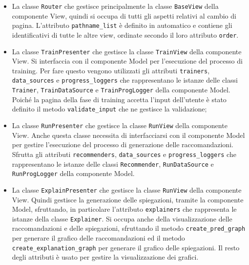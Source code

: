 \begin{itemize}
\item La classe \texttt{Router} che gestisce principalmente la classe \texttt{BaseView} della componente View, quindi si occupa di tutti gli aspetti relativi al cambio di pagina. L'attributo \texttt{pathname\_list} è definito in automatico e contiene gli identificativi di tutte le altre view, ordinate secondo il loro attributo \texttt{order}.

\item La classe \texttt{TrainPresenter} che gestisce la classe \texttt{TrainView} della componente View. Si interfaccia con il componente Model per l'esecuzione del processo di training. Per fare questo vengono utilizzati gli attributi \texttt{trainers}, \texttt{data\_sources} e \texttt{progress\_loggers} che rappresentano le istanze delle classi \texttt{Trainer}, \texttt{TrainDataSource} e \texttt{TrainProgLogger} della componente Model. Poiché la pagina della fase di training accetta l'input dell'utente è stato definito il metodo \texttt{validate\_input} che ne gestisce la validazione;

\item La classe \texttt{RunPresenter} che gestisce la classe \texttt{RunView} della componente View. Anche questa classe necessita di interfacciarsi con il componente Model per gestire l'esecuzione del processo di generazione delle raccomandazioni. Sfrutta gli attributi \texttt{recommenders}, \texttt{data\_sources} e \texttt{progress\_loggers} che rappresentano le istanze delle classi \texttt{Recommender}, \texttt{RunDataSource} e \texttt{RunProgLogger} della componente Model.

\item La classe \texttt{ExplainPresenter} che gestisce la classe \texttt{RunView} della componente View. Quindi gestisce la generazione delle spiegazioni, tramite la componente Model, sfruttando, in particolare l'attributo \texttt{explainers} che rappresenta le istanze della classe \texttt{Explainer}. Si occupa anche della visualizzazione delle raccomandazioni e delle spiegazioni, sfruttando il metodo \texttt{create\_pred\_graph} per generare il grafico delle raccomandazioni ed il metodo \texttt{create\_explanation\_graph} per generare il grafico delle spiegazioni. Il resto degli attributi è usato per gestire la visualizzazione dei grafici.

\end{itemize}

